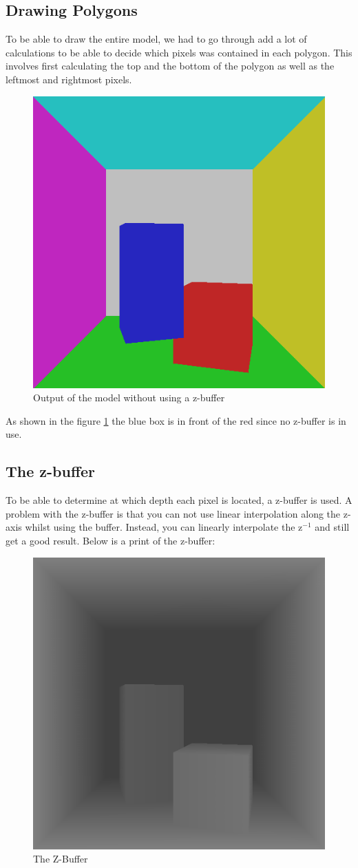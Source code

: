 \documentclass[a4paper,11pt]{article}
\begin{document}
\subsection{Drawing Polygons}
To be able to draw the entire model, we had to go through add a lot of calculations to be able to decide which pixels was contained in each polygon. This involves first calculating the top and the bottom of the polygon as well as the leftmost and rightmost pixels.   

\begin{figure}[h!]
	\centering	
	\includegraphics[width=0.45\linewidth]{screenshot15.png}
	\caption{Output of the model without using a z-buffer}
	\label{fig15}
\end{figure}

As shown in the figure \ref{fig15} the blue box is in front of the red since no z-buffer is in use.

\subsection{The z-buffer}
To be able to determine at which depth each pixel is located, a z-buffer is used. A problem with the z-buffer is that you can not use linear interpolation along the z-axis whilst using the buffer. Instead, you can linearly interpolate the z$^{-1}$ and still get a good result. Below is a print of the z-buffer:

\begin{figure}[h!]
	\centering
	\includegraphics[width=0.45\linewidth]{screenshotz.png}
	\caption{The Z-Buffer}
	\label{figz}
\end{figure}
\end{document}
